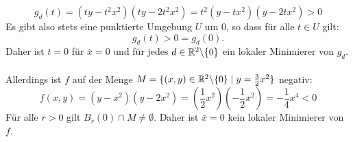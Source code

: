 \begin{compactenum}[(i)]
\begin{displaymath}
   g_d(t)=(ty-t^2x^2)(ty-2t^2x^2)=t^2(y-tx^2)(y-2tx^2)>0
 \end{displaymath}
Es gibt also stets eine punktierte Umgebung $U$ um $0$, so dass für alle $t\in U$ gilt:
 \begin{displaymath}
  g_d(t)>0=g_d(0).
 \end{displaymath}
Daher ist $t=0$ für $\bar x=0$ und für jedes $d\in\mathbb{R}^2\backslash\{0\}$ ein lokaler Minimierer von $g_d$.\\\\ Allerdings ist $f$ auf der Menge $M=\{(x,y)\in\mathbb{R}^2\backslash \{0\}\mid y=\frac{3}{2}x^2\}$ negativ:
$$f(x,y)=(y-x^2)(y-2x^2)=\left(\frac{1}{2}x^2\right)\left(-\frac{1}{2}x^2\right)=-\frac{1}{4}x^4<0$$
Für alle $r>0$ gilt $B_r(0)\cap M\neq\emptyset$. Daher ist $\bar x=0$ kein lokaler Minimierer von $f$.
\end{compactenum}
